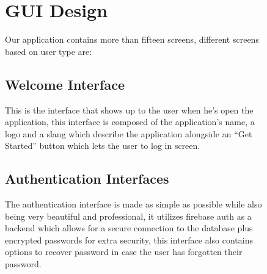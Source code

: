 \begin{figure}
\section{GUI Design}
Our application contains more than fifteen screens, different screens based on user type are:
\end{figure}

\begin{figure}
\subsection{Welcome Interface}
This is the interface that shows up to the user when he’s open the application, this interface is composed of the application’s name, a logo and a slang which describe the application alongside an “Get Started” button which lets the user to log in screen.
\begin{center}
\end{center}
\subsection{Authentication Interfaces}
The authentication interface is made as simple as possible while also being very beautiful and professional, it utilizes firebase auth as a backend which allows for a secure connection to the database plus encrypted passwords for extra security, this interface also contains options to recover password in case the user has forgotten their password.

\end{figure}

\begin{figure}
\hspace*{\fill}
\hfill 
{}
\hspace*{\fill}
\end{figure}

\begin{figure}
\centering
{}
\end{figure}

